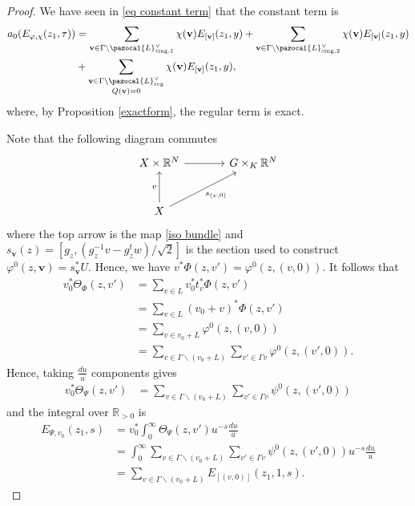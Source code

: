 \documentclass[a4paper,11pt]{amsart} %
\newcommand{\8}{\infty}
\newcommand{\vbf}{\mathbf{v}}
\newcommand{\R}{\mathbb{R}}
\newcommand{\sing}{\mathrm{sing}}
\newcommand{\reg}{\mathrm{reg}}
\newcommand{\Lcal}{\pazocal{L}}
\theoremstyle{mytheoremstyle}
\theoremstyle{remark}
\numberwithin{equation}{section}
\begin{document}
\begin{proof} We have seen in \eqref{eq constant term} that the constant term is
\begin{align} 
a_0(E_{\varphi, \chi}(z_1,\tau)) & =\sum_{\vbf \in \Gamma \backslash \Lcal^\vee_{\sing,1} } \chi(\vbf) E_{[\vbf]}(z_1,y) + \sum_{\vbf \in \Gamma \backslash \Lcal^\vee_{\sing,2}} \chi(\vbf) E_{[\vbf]}(z_1,y) \nonumber \\
& + \sum_{\substack{\vbf \in \Gamma \backslash \Lcal^\vee_{\reg} \\ Q(\vbf)=0}} \chi(\vbf) E_{[\vbf]}(z_1,y),
\end{align}
where, by Proposition \ref{exactform}, the regular term is exact.

Note that the following diagram commutes
\begin{equation}
\begin{tikzcd}[column sep=large,row sep=large]
X\times \R^N \arrow[r] & G \times_K \R^N  \\
X \arrow[u, "v"] \arrow[ru, swap, "s_{(v,0)}"] &
\end{tikzcd}
\end{equation}
where the top arrow is the map \eqref{iso bundle} and $s_{\vbf}(z)=\left [g_z, (g_z^{-1}v-g_z^tw)/\sqrt{2} \right ]$ is the section used to construct $\varphi^0(z,\vbf)=s_\vbf^\ast U$. Hence, we have $v^\ast \Phi(z,v')=\varphi^0(z,(v,0))$. It follows that 
\begin{align}
v_0^\ast \Theta_\Phi(z,v') & = \sum_{v \in L} v_0^\ast t_{v}^\ast \Phi(z,v')  \nonumber \\ 
& = \sum_{v \in L} (v_0+v)^\ast \Phi(z,v') \nonumber \\
& = \sum_{v \in v_0+L} \varphi^0(z,(v,0)) \nonumber \\
& = \sum_{v \in \Gamma \backslash (v_0+L)} \sum_{v' \in \Gamma v} \varphi^0(z,(v',0)).
\end{align}
Hence, taking $\frac{du}{u}$ components gives
\begin{align}
v_0^\ast \Theta_\Psi(z,v') & = \sum_{v \in \Gamma \backslash (v_0+L)} \sum_{v' \in \Gamma v} \psi^0(z,(v',0))
\end{align}
and the integral over $\R_{>0}$ is
\begin{align}
E_{\Psi,v_0}(z_1,s)& = v_0^\ast \int_0^\8 \Theta_\Psi(z,v') u^{-s}\frac{du}{u} \nonumber \\
&= \int_0^\8 \sum_{v \in \Gamma \backslash (v_0+L)} \sum_{v' \in \Gamma v} \psi^0(z,(v',0)) u^{-s} \frac{du}{u} \nonumber \\
& = \sum_{v \in \Gamma \backslash (v_0+L)} E_{[(v,0)]}(z_1,1,s).

\end{align}
\end{proof}
\end{document}
